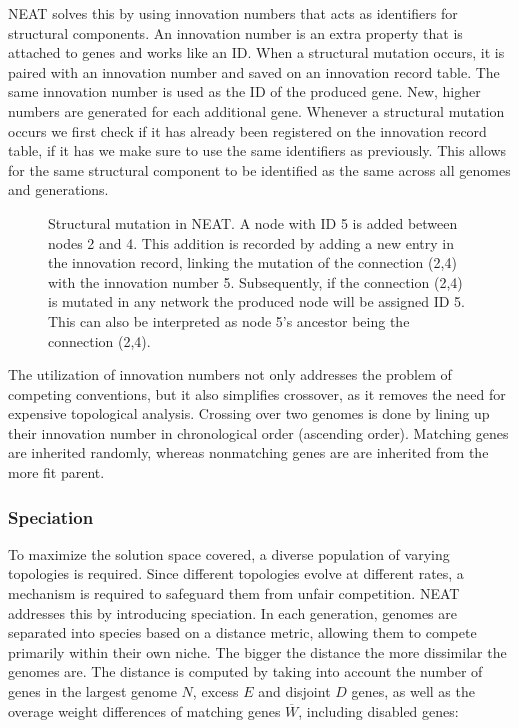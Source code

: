 \documentclass[letterpaper, 12pt]{article}
\begin{document}
NEAT solves this by using innovation numbers that acts as identifiers for structural
components. An innovation number is an extra property that is attached to genes and
works like an ID. When a structural mutation occurs, it is paired with an innovation
number and saved on an innovation record table. The same innovation number is used as
the ID of the produced gene. New, higher numbers are generated for each additional gene.
Whenever a structural mutation occurs we first check if it has already been registered
on the innovation record table, if it has we make sure to use the same identifiers as
previously. This allows for the same structural component to be identified as the same
across all genomes and generations.

\begin{figure}[H]
    \centering
    
    \caption{
      Structural mutation in NEAT. A node with ID 5 is added between nodes 2 and 4. This
      addition is recorded by adding a new entry in the innovation record, linking the
      mutation of the connection (2,4) with the innovation number 5. Subsequently, if
      the connection (2,4) is mutated in any network the produced node will be assigned
      ID 5. This can also be interpreted as node 5's ancestor being the connection
      (2,4).
    }
\end{figure}

The utilization of innovation numbers not only addresses the problem of competing
conventions, but it also simplifies crossover, as it removes the need for expensive
topological analysis. Crossing over two genomes is done by lining up their innovation
number in chronological order (ascending order). Matching genes are inherited randomly,
whereas nonmatching genes are are inherited from the more fit parent.

\subsubsection{Speciation}
To maximize the solution space covered, a diverse population of varying topologies is
required. Since different topologies evolve at different rates, a mechanism is required
to safeguard them from unfair competition. NEAT addresses this by introducing
speciation. In each generation, genomes are separated into species based on a distance
metric, allowing them to compete primarily within their own niche. The bigger the
distance the more dissimilar the genomes are. The distance is computed by taking into
account the number of genes in the largest genome \(N\), excess \(E\) and disjoint \(D\)
genes, as well as the overage weight differences of matching genes \(\overline{W}\),
including disabled genes:
\end{document}
